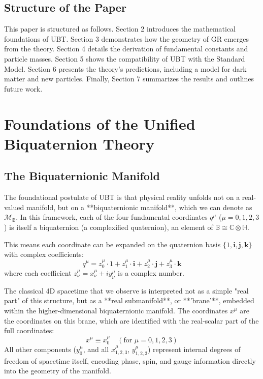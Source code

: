 \documentclass[12pt, a4paper]{article}
\begin{document}
\subsection{Structure of the Paper}
This paper is structured as follows. Section 2 introduces the mathematical foundations of UBT. Section 3 demonstrates how the geometry of GR emerges from the theory. Section 4 details the derivation of fundamental constants and particle masses. Section 5 shows the compatibility of UBT with the Standard Model. Section 6 presents the theory's predictions, including a model for dark matter and new particles. Finally, Section 7 summarizes the results and outlines future work.

\section{Foundations of the Unified Biquaternion Theory}

\subsection{The Biquaternionic Manifold}
The foundational postulate of UBT is that physical reality unfolds not on a real-valued manifold, but on a **biquaternionic manifold**, which we can denote as \( \mathcal{M}_{\mathbb{B}} \). In this framework, each of the four fundamental coordinates \(q^\mu\) (\(\mu=0,1,2,3\)) is itself a biquaternion (a complexified quaternion), an element of \( \mathbb{B} \cong \mathbb{C} \otimes \mathbb{H} \).

This means each coordinate can be expanded on the quaternion basis \( \{1, \mathbf{i}, \mathbf{j}, \mathbf{k}\} \) with complex coefficients:
\begin{equation}
    q^\mu = z_0^\mu \cdot 1 + z_1^\mu \cdot \mathbf{i} + z_2^\mu \cdot \mathbf{j} + z_3^\mu \cdot \mathbf{k}
\end{equation}
where each coefficient \( z_\nu^\mu = x_\nu^\mu + i y_\nu^\mu \) is a complex number.

The classical 4D spacetime that we observe is interpreted not as a simple "real part" of this structure, but as a **real submanifold**, or **'brane'**, embedded within the higher-dimensional biquaternionic manifold. The coordinates \(x^\mu\) are the coordinates on this brane, which are identified with the real-scalar part of the full coordinates:
\begin{equation}
    x^\mu \equiv x_0^\mu \quad (\text{for } \mu=0,1,2,3)
\end{equation}
All other components (\(y_0^\mu\), and all \(x_{1,2,3}^\mu\), \(y_{1,2,3}^\mu\)) represent internal degrees of freedom of spacetime itself, encoding phase, spin, and gauge information directly into the geometry of the manifold.
\end{document}
